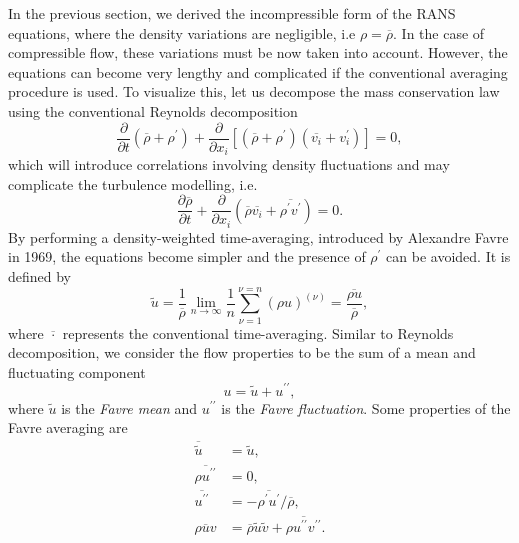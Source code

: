 In the previous section, we derived the incompressible form of the RANS equations, where the density variations are negligible, i.e $\rho=\overline{\rho}$. In the case of compressible flow, these variations must be now taken into account. However, the equations can become very lengthy and complicated if the conventional averaging procedure is used. To visualize this, let us decompose the mass conservation law using the conventional Reynolds decomposition
\begin{equation}
    \frac{\partial}{\partial t} \left(\overline{\rho} + \rho^\prime\right) + \frac{\partial }{\partial x_i} \left[\left(\overline{\rho}+\rho^\prime\right)\left(\overline{v_i}+v_i^\prime\right)\right] = 0,
\end{equation}
which will introduce correlations involving density fluctuations and may complicate the turbulence modelling, i.e.
\begin{equation}
    \frac{\partial \overline{\rho}}{\partial t}  + \frac{\partial }{\partial x_i} \left(\overline \rho \overline{v_i} + \overline{\rho^\prime v^\prime}\right) = 0.
\end{equation}
By performing a density-weighted time-averaging, introduced by Alexandre Favre in 1969, the equations become simpler and the presence of $\rho^\prime$ can be avoided. It is defined by
\begin{equation}
    \tilde{u}=  \frac{1}{\overline{\rho}} \lim_{n\rightarrow\infty} \frac{1}{n}\sum_{\nu=1}^{\nu=n}\left(\rho u\right)^{(\nu)} = \frac{\overline{\rho u}}{\overline{\rho}},
    \label{eqn:favre_definition}
\end{equation}
where $\overline{\cdot}$ represents the conventional time-averaging. Similar to Reynolds decomposition, we consider the flow properties to be the sum of a mean and fluctuating component
\begin{equation}
    u = \tilde{u} + u^{\prime\prime},
\end{equation}
where $\tilde{u}$ is the \textit{Favre mean} and $u^{\prime\prime}$ is the \textit{Favre fluctuation}. Some properties of the Favre averaging are
\begin{align}
    \overline{\tilde{u}} &= \tilde{u},\\
    \overline{\rho u^{\prime\prime}} &= 0, \\
    \overline{u^{\prime\prime}} &= -\overline{\rho^\prime u^\prime}/{\overline{\rho}}, \\ 
    \overline{\rho u v} &= \overline{\rho}\tilde u\tilde v + \overline{\rho u^{\prime\prime}v^{\prime\prime}}. \label{eqn:favre_rhouv}
\end{align}
